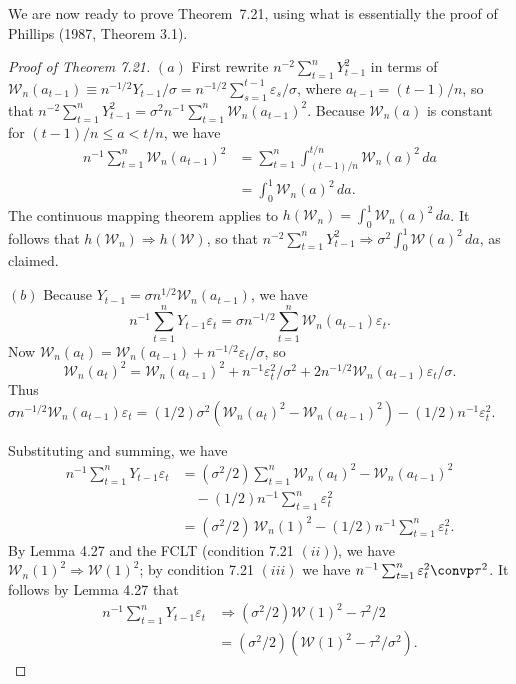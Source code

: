 We are now ready to prove Theorem~7.21, using what is essentially the proof of Phillips (1987, Theorem 3.1).

\begin{proof}[Proof of Theorem 7.21]
$(a)$ First rewrite $n^{-2}\sum_{t=1}^{n} Y_{t-1}^2$ in terms of $\mathcal{W}_n(a_{t-1}) \equiv n^{-1/2}Y_{t-1}/\sigma = n^{-1/2}\sum_{s=1}^{t-1} \varepsilon_s / \sigma$, where $a_{t-1} = (t-1)/n$, so that $n^{-2}\sum_{t=1}^{n} Y_{t-1}^2 = \sigma^2 n^{-1}\sum_{t=1}^{n} \mathcal{W}_n(a_{t-1})^2$. Because $\mathcal{W}_n(a)$ is constant for $(t-1)/n \leq a < t/n$, we have
\begin{align*}
n^{-1}\sum_{t=1}^{n} \mathcal{W}_n(a_{t-1})^2 &= \sum_{t=1}^{n} \int_{(t-1)/n}^{t/n} \mathcal{W}_n(a)^2\,da \\
&= \int_0^1 \mathcal{W}_n(a)^2\,da.
\end{align*}
The continuous mapping theorem applies to $h(\mathcal{W}_n) = \int_0^1 \mathcal{W}_n(a)^2\,da$. It follows that $h(\mathcal{W}_n) \Rightarrow h(\mathcal{W})$, so that $n^{-2}\sum_{t=1}^{n} Y_{t-1}^2 \Rightarrow \sigma^2 \int_0^1 \mathcal{W}(a)^2\,da$, as claimed.

$(b)$ Because $Y_{t-1} = \sigma n^{1/2}\mathcal{W}_n(a_{t-1})$, we have
\[
n^{-1}\sum_{t=1}^{n} Y_{t-1}\varepsilon_t = \sigma n^{-1/2}\sum_{t=1}^{n} \mathcal{W}_n(a_{t-1})\varepsilon_t.
\]
Now $\mathcal{W}_n(a_t) = \mathcal{W}_n(a_{t-1}) + n^{-1/2}\varepsilon_t / \sigma$, so
\[
\mathcal{W}_n(a_t)^2 = \mathcal{W}_n(a_{t-1})^2 + n^{-1}\varepsilon_t^2 / \sigma^2 + 2n^{-1/2}\mathcal{W}_n(a_{t-1})\varepsilon_t / \sigma.
\]
Thus $\sigma n^{-1/2}\mathcal{W}_n(a_{t-1})\varepsilon_t = (1/2)\sigma^2\left(\mathcal{W}_n(a_t)^2 - \mathcal{W}_n(a_{t-1})^2\right) - (1/2)n^{-1}\varepsilon_t^2$.

Substituting and summing, we have
\begin{align*}
n^{-1}\sum_{t=1}^{n} Y_{t-1}\varepsilon_t &= (\sigma^2/2)\sum_{t=1}^{n} \mathcal{W}_n(a_t)^2 - \mathcal{W}_n(a_{t-1})^2 \\
&\quad -(1/2)n^{-1}\sum_{t=1}^{n} \varepsilon_t^2 \\
&= (\sigma^2/2)\,\mathcal{W}_n(1)^2 - (1/2)n^{-1}\sum_{t=1}^{n} \varepsilon_t^2.
\end{align*}
By Lemma 4.27 and the FCLT (condition 7.21 $(ii)$), we have $\mathcal{W}_n(1)^2 \Rightarrow \mathcal{W}(1)^2$; by condition 7.21 $(iii)$ we have $n^{-1}\sum_{t=1}^{n} \varepsilon_t^2 \convp \tau^2$. It follows by Lemma 4.27 that
\begin{align*}
n^{-1}\sum_{t=1}^{n} Y_{t-1}\varepsilon_t &\Rightarrow (\sigma^2/2)\mathcal{W}(1)^2 - \tau^2/2 \\
&= (\sigma^2/2)\left(\mathcal{W}(1)^2 - \tau^2/\sigma^2\right).
\end{align*}


\end{proof}
